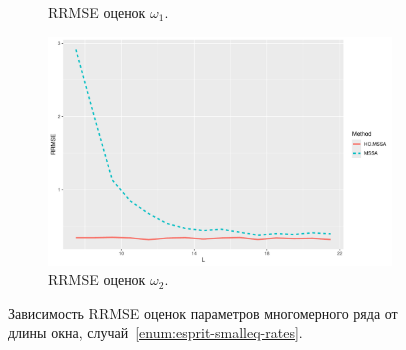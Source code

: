 \documentclass[specialist,
  substylefile=spbu.rtx,
subf,href,colorlinks=true, 12pt]{disser}
\theoremstyle{plain}
\theoremstyle{definition}
\theoremstyle{remark}
\begin{document}
\begin{figure}[!ht]
\begin{subfigure}{0.49\linewidth}
    \caption{RRMSE оценок $\omega_1$.}
    \label{fig:freq1_L_small_eq_rates}
  \end{subfigure}
  \begin{subfigure}{0.49\linewidth}
    \includegraphics[width=\linewidth]{freq2_L_small_eq_rates.pdf}
    \caption{RRMSE оценок $\omega_2$.}
    \label{fig:freq2_L_small_eq_rates}
  \end{subfigure}
  \caption{Зависимость RRMSE оценок параметров многомерного ряда от длины окна,
  случай~\ref{enum:esprit-smalleq-rates}.}
  \label{fig:L_small_eq_rates}
\end{figure}
\end{document}
